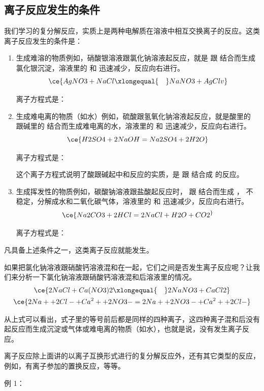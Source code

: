 \subsection{离子反应发生的条件}
我们学习的复分解反应，实质上是两种电解质在溶液中相互交换离子的反应。这类离子反应发生的条件是：
\begin{enumerate}
  \item 生成难溶的物质\quad 例如，硝酸银溶液跟氯化钠溶液起反应，就是  跟  结合而生成氯化银沉淀，溶液里的  和  迅速减少，反应向右进行。
  \[ \ce{ AgNO3 + NaCl \xlongequal{\quad} NaNO3 + AgCl v }\]

  离子方程式是：
  \item 生成难电离的物质（如水）\quad 例如，硫酸跟氢氧化钠溶液起反应，就是酸里的  跟碱里的  结合而生成难电离的水，溶液里的  和  迅速减少，反应向右进行。
  \[ \ce{ H2SO4 + 2NaOH = Na2SO4 + 2H2O } \]

  离子方程式是：

  这个离子方程式说明了酸跟碱起中和反应的实质，是  跟  结合成  的反应。
  \item 生成挥发性的物质\quad 例如，碳酸钠溶液跟盐酸起反应时， 跟  结合而生成 ， 不稳定，分解成水和二氧化碳气体，溶液里的  和  迅速减少，反应向右进行。
  \[ \ce{ Na2CO3 + 2HCl = 2NaCl + H2O + CO2 ^} \]

  离子方程式是：
\end{enumerate}

\bigskip
凡具备上述条件之一，这类离子反应就能发生。

如果把氯化钠溶液跟硝酸钙溶液混和在一起，它们之间是否发生离子反应呢？让我们来分析一下氯化钠溶液跟硝酸钙溶液混和后溶液里的情况。
\begin{gather*}
  \ce{ 2NaCl + Ca(NO3)2 \xlongequal{\quad} 2NaNO3 + CaCl2 } \\
  \ce{ 2Na+ + 2Cl- + Ca^2+ +2NO3- = 2Na+ + 2NO3- + Ca^2+ + 2Cl- } 
\end{gather*}

从上式可以看出，式子里的等号前后都是同样的四种离子，这四种离子混和后没有起反应而生成沉淀或气体或难电离的物质（如水），也就是说，没有发生离子反应。

离子反应除上面讲的以离子互换形式进行的复分解反应外，还有其它类型的反应，例如，有离子参加的置换反应，等等。

例 1：

